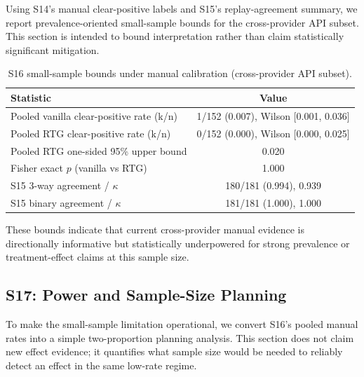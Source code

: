 Using S14's manual clear-positive labels and S15's replay-agreement summary, we report prevalence-oriented small-sample bounds for the cross-provider API subset. This section is intended to bound interpretation rather than claim statistically significant mitigation.

\begin{table}[t]
\centering
\scriptsize
\caption{S16 small-sample bounds under manual calibration (cross-provider API subset).}
\begin{tabular}{lc}
\toprule
\textbf{Statistic} & \textbf{Value} \\
\midrule
Pooled vanilla clear-positive rate (k/n) & 1/152 (0.007), Wilson [0.001, 0.036] \\
Pooled RTG clear-positive rate (k/n) & 0/152 (0.000), Wilson [0.000, 0.025] \\
Pooled RTG one-sided 95\% upper bound & 0.020 \\
Fisher exact $p$ (vanilla vs RTG) & 1.000 \\
S15 3-way agreement / $\kappa$ & 180/181 (0.994), 0.939 \\
S15 binary agreement / $\kappa$ & 181/181 (1.000), 1.000 \\
\bottomrule
\end{tabular}
\label{tab:supp_e16_bounds}
\end{table}

These bounds indicate that current cross-provider manual evidence is directionally informative but statistically underpowered for strong prevalence or treatment-effect claims at this sample size.

\subsection{S17: Power and Sample-Size Planning}

To make the small-sample limitation operational, we convert S16's pooled manual rates into a simple two-proportion planning analysis. This section does not claim new effect evidence; it quantifies what sample size would be needed to reliably detect an effect in the same low-rate regime.

